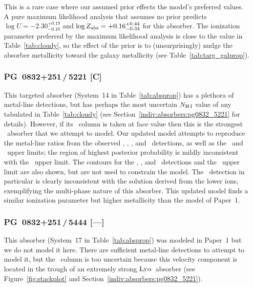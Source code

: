 \documentclass[twocolumn,twocolappendix,tighten,times]{aastex6}
\newcommand{\HI}{\ion{H}{1}}
\newcommand{\CI}{\ion{C}{1}}
\newcommand{\CII}{\ion{C}{2}}
\newcommand{\CIV}{\ion{C}{4}}
\newcommand{\NV}{\ion{N}{5}}
\newcommand{\OI}{\ion{O}{1}}
\newcommand{\SiII}{\ion{Si}{2}}
\newcommand{\SiIII}{\ion{Si}{3}}
\newcommand{\SiIV}{\ion{Si}{4}}
\newcommand{\FeII}{\ion{Fe}{2}}
\newcommand{\FeIII}{\ion{Fe}{3}}
\newcommand{\lya}{\ensuremath{{\rm Ly}\alpha}}
\begin{document}
This is a rare case where our assumed prior effects the model's preferred values. 
A pure maximum likelihood analysis that assumes no prior predicts 
$\log{U}=-2.30^{+0.19}_{-0.18}$ and $\log{Z_{\rm abs}}=+0.16^{+0.44}_{-0.34}$ 
for this absorber.  The ionization parameter preferred by the maximum 
likelihood analysis is close to the value in Table~\ref{tab:cloudy}, so
the effect of the prior is to (unsurprisingly) nudge the absorber metallicity 
toward the galaxy metallicity (see Table~\ref{tab:targ_galprop}).


\subsubsection{PG~0832+251\,/\,5221 [C]}
\label{indiv:cloudy:pg0832_5221}

This targeted absorber (System~14 in Table~\ref{tab:absprop}) has a plethora of 
metal-line detections, but has perhaps the most uncertain $N_{\rm H\,I}$ value of 
any tabulated in Table~\ref{tab:cloudy} (see 
Section~\ref{indiv:absorbers:pg0832_5221} for details). However, if its 
\HI\ column is taken at face value then this is the strongest \HI\ absorber that
we attempt to model. Our updated model attempts to reproduce the metal-line ratios 
from the observed \OI, \CII, \SiII, and \FeII\ detections, as well as the \CI\ and 
\FeIII\ upper limits; the region of highest posterior probability is mildly 
inconsistent with the \CI\ upper limit. The contours for the \SiIII, \SiIV, and 
\CIV\ detections and the \NV\ upper limit are also shown, but are not used to 
constrain the model. The \CIV\ detection in particular is clearly inconsistent with 
the solution derived from the lower ions, exemplifying the multi-phase nature of 
this absorber. This updated model finds a similar ionization parameter but higher 
metallicity than the model of Paper~1.


\subsubsection{PG~0832+251\,/\,5444 [---]}
\label{indiv:cloudy:pg0832_5444}

This absorber (System~17 in Table~\ref{tab:absprop}) was modeled in Paper~1 but we 
do not model it here. There are sufficient metal-line detections to attempt to 
model it, but the \HI\ column is too uncertain because this velocity component is 
located in the trough of an extremely strong \lya\ absorber (see 
Figure~\ref{fig:stackplot} and Section~\ref{indiv:absorbers:pg0832_5221}).
\end{document}
